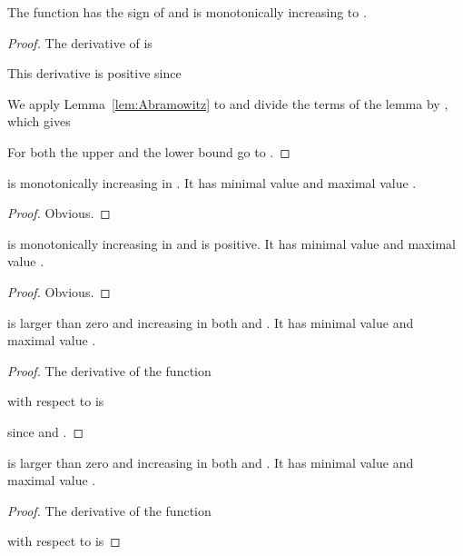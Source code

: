 \documentclass{article}
\begin{document}
\begin{lemma}[Properties of ]
\label{lem:xeErfc}

The function  has the sign of  and is
monotonically increasing to .
\end{lemma}
\begin{proof}
The derivative of   is

This derivative is positive since


We apply Lemma~\ref{lem:Abramowitz}
to  and divide the terms of the lemma by ,
which gives

For  both the upper and the lower bound go to 
.
\end{proof}


\begin{lemma}[Function ]
\label{lem:x11}

 is monotonically increasing in .
It has minimal value  and maximal value
.
\end{lemma}
\begin{proof}
Obvious.
\end{proof}

\begin{lemma}[Function ]
\label{lem:x22}

 is
monotonically increasing in  and is positive.
It has minimal value  and maximal value
.
\end{lemma}
\begin{proof}
Obvious. 
\end{proof}


\begin{lemma}[Function ]
\label{lem:xx1}


is larger than zero and increasing in both  and .
It has minimal value  and maximal value
.
\end{lemma}
\begin{proof}
The derivative of the function

with respect to  is

since  and .
\end{proof}

\begin{lemma}[Function ]
\label{lem:xx2}


is larger than zero and increasing in both  and .
It has minimal value  and maximal value
.
\end{lemma}
\begin{proof}
The derivative of the function

with respect to  is

\end{proof}
\end{document}
